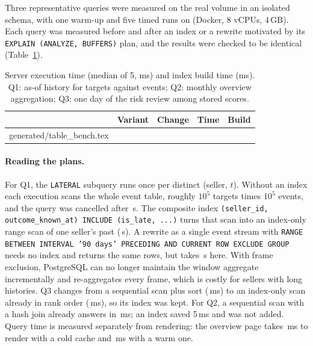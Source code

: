 \documentclass[10pt,twocolumn]{article}
\makeatletter
\newcommand{\code}[1]{\texttt{\small #1}}
\newcommand{\inputtable}[1]{\@@input #1 }
\makeatother
\begin{document}
Three representative queries were measured on the real volume in an isolated schema, with one warm-up
and five timed runs on \PGVersion{} (Docker, 8 vCPUs, 4\,GB). Each query was measured before and after
an index or a rewrite motivated by its \code{EXPLAIN (ANALYZE, BUFFERS)} plan, and the results were
checked to be identical (Table~\ref{tab:bench}).

\begin{table}[t]
\centering\scriptsize
\setlength{\tabcolsep}{2.5pt}
\caption{Server execution time (median of 5, ms) and index build time (ms). Q1: as-of history for
\NTargets{} targets against \NOutcomeEvents{} events; Q2: monthly overview aggregation; Q3: one day of
the risk review among \NPredictions{} stored scores.}
\label{tab:bench}
\begin{tabularx}{\columnwidth}{@{}l l X r r@{}}
\toprule
& Variant & Change & Time & Build \\
\midrule
\inputtable{generated/table_bench.tex}
\bottomrule
\end{tabularx}
\end{table}

\paragraph{Reading the plans.} For Q1, the \code{LATERAL} subquery runs once per distinct (seller, $t$).
Without an index each execution scans the whole event table, roughly $10^5$ targets times $10^5$
events, and the query was cancelled after \QOneBefore{}\,s. The composite index
\code{(seller\_id, outcome\_known\_at) INCLUDE (is\_late, ...)} turns that scan into an index-only range
scan of one seller's past (\QOneAfter{}\,s). A rewrite as a single event stream with
\code{RANGE BETWEEN INTERVAL '90 days' PRECEDING AND CURRENT ROW EXCLUDE GROUP}~\cite{pgdocs} needs no
index and returns the same rows, but takes \QOneWindow{}\,s here. With frame exclusion, PostgreSQL can
no longer maintain the window aggregate incrementally and re-aggregates every frame, which is costly
for sellers with long histories. Q3 changes from a sequential scan plus sort (\QThreeBefore{}\,ms) to an
index-only scan already in rank order (\QThreeAfter{}\,ms), so its index was kept. For Q2, a
sequential scan with a hash join already answers in \QTwoBefore{}\,ms; an index saved 5\,ms and was not
added. Query time is measured separately from rendering: the overview page takes \DashOverviewCold{}\,ms
to render with a cold cache and \DashOverviewWarm{}\,ms with a warm one.
\end{document}
